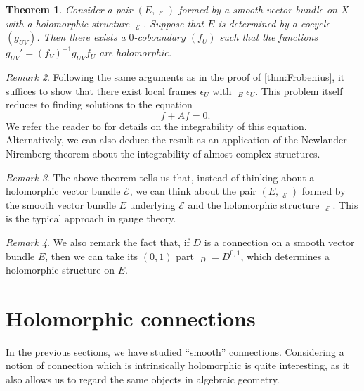 \documentclass[12pt,a4paper]{amsbook}
\newtheorem{thm}{Theorem}[chapter]
\theoremstyle{remark} \newtheorem{rmk}[thm]{Remark}
\theoremstyle{definition} \newtheorem{defn}[thm]{Definition}
\theoremstyle{definition} \newtheorem{ex}[thm]{Example}
\theoremstyle{definition} \newtheorem{ej}{Exercise}
\newcommand{\sE}{\mathscr E}
\DeclareMathOperator{\delbar}{\bar{\partial}}
\begin{document}
\begin{thm}
Consider a pair $(E,\delbar_{\sE})$ formed by a smooth vector bundle on $X$ with a holomorphic structure $\delbar_{\sE}$. Suppose that  $E$ is determined by a cocycle $(g_{UV})$. Then there exists a $0$-coboundary $(f_U)$ such that the functions $g_{UV}'=(f_V)^{-1}g_{UV}f_U$ are holomorphic.
\end{thm}

\begin{rmk}
Following the same arguments as in the proof of \ref{thm:Frobenius}, it suffices to show that there exist local frames $\epsilon_U$ with  $\delbar_E \epsilon_U$. This problem itself reduces to finding solutions to the equation
 \begin{equation*}
\delbar f + Af = 0.
\end{equation*} 
We refer the reader to \cite[Section 5]{AtiyahBott} for details on the integrability of this equation. Alternatively, we can also deduce the result as an application of the Newlander--Niremberg theorem about the integrability of almost-complex structures.
\end{rmk}

\begin{rmk}
The above theorem tells us that, instead of thinking about a holomorphic vector bundle $\sE$, we can think about the pair $(E,\delbar_{\sE})$ formed by the smooth vector bundle $E$ underlying $\sE$ and the holomorphic structure $\delbar_\sE$. This is the typical approach in gauge theory.
\end{rmk}

\begin{rmk}
We also remark the fact that, if $D$ is a connection on a smooth vector bundle $E$, then we can take its $(0,1)$ part $\delbar_D=D^{0,1}$, which determines a holomorphic structure on $E$. 
\end{rmk}

\section{Holomorphic connections}
In the previous sections, we have studied ``smooth'' connections. Considering a notion of connection which is intrinsically holomorphic is quite interesting, as it also allows us to regard the same objects in algebraic geometry.
\end{document}
